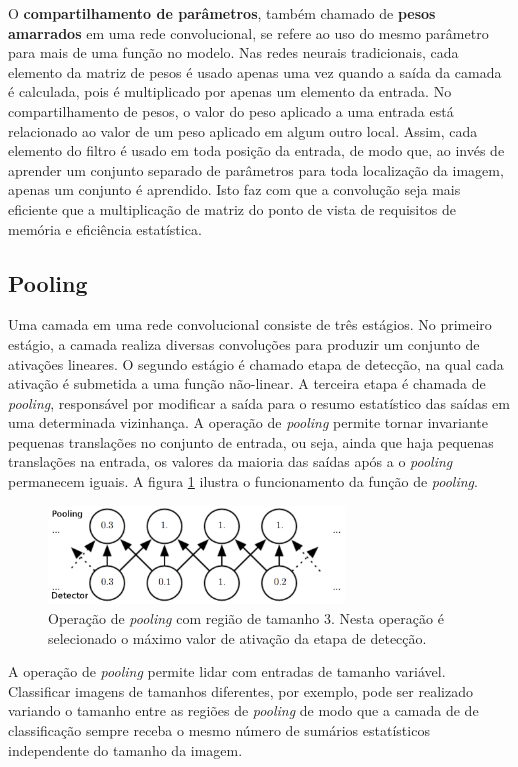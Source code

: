 O \textbf{compartilhamento de parâmetros}, também chamado de \textbf{pesos amarrados} 
em uma rede convolucional, se refere ao uso do mesmo parâmetro para mais de uma função no modelo.
Nas redes neurais tradicionais, cada elemento da matriz de pesos é usado apenas uma vez quando a
saída da camada é calculada, pois é multiplicado por apenas um elemento da entrada. No compartilhamento
de pesos, o valor do peso aplicado a uma entrada está relacionado ao valor de um peso aplicado em
algum outro local. Assim, cada elemento do filtro é usado em toda posição da entrada,
de modo que, ao invés de aprender um conjunto separado de parâmetros para toda localização da imagem, apenas
um conjunto é aprendido. Isto faz com que a convolução seja mais eficiente que a multiplicação de matriz
do ponto de vista de requisitos de memória e eficiência estatística.


\subsection{Pooling}
Uma camada em uma rede convolucional consiste de três estágios. No primeiro estágio,
a camada realiza diversas convoluções para produzir um conjunto de ativações lineares.
O segundo estágio é chamado etapa de detecção, na qual cada ativação é submetida a uma
função não-linear. A terceira etapa é chamada de \textit{pooling}, responsável por
modificar a saída para o resumo estatístico das saídas em uma determinada vizinhança. A operação de
\textit{pooling} permite tornar invariante pequenas translações no conjunto de entrada,
ou seja, ainda que haja pequenas translações na entrada, os valores da maioria das saídas após a
o \textit{pooling} permanecem iguais. A figura \ref{fig:pool} ilustra o funcionamento da função de \textit{pooling}.
\begin{figure}[htp]
\begin{center}
  \includegraphics[width=0.7\textwidth]{fig/pool}
  \caption{Operação de \textit{pooling} com região de tamanho 3. Nesta operação é selecionado o máximo valor de ativação da etapa de detecção.}
  \label{fig:pool}
\end{center}
\end{figure}

A operação de \textit{pooling} permite lidar com entradas de tamanho variável.
Classificar imagens de tamanhos diferentes, por exemplo, pode ser realizado
variando o tamanho entre as regiões de \textit{pooling} de modo que a camada de 
de classificação sempre receba o mesmo número de sumários estatísticos
independente do tamanho da imagem.









